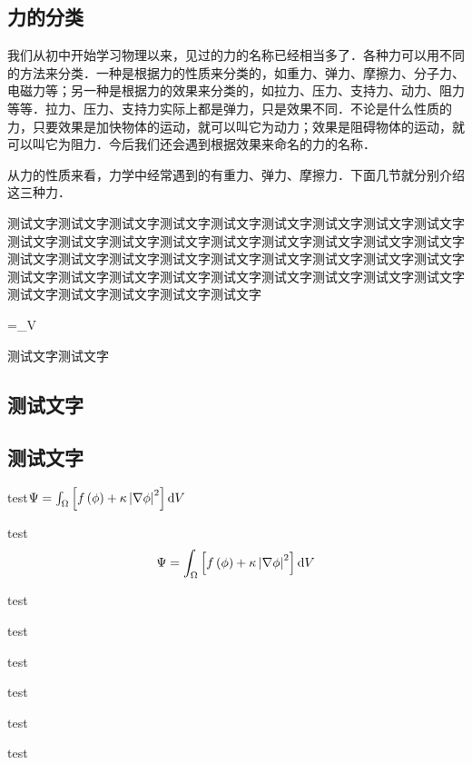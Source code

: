 \begin{Quiz}
\subsection{力的分类}

我们从初中开始学习物理以来，见过的力的名称已经相当多了．各种力可以用不同的方法来分类．一种是根据力的性质来分类的，如重力、弹力、摩擦力、分子力、电磁力等；另一种是根据力的效果来分类的，如拉力、压力、支持力、动力、阻力等等．拉力、压力、支持力实际上都是弹力，只是效果不同．不论是什么性质的力，只要效果是加快物体的运动，就可以叫它为动力；效果是阻碍物体的运动，就可以叫它为阻力．今后我们还会遇到根据效果来命名的力的名称．

从力的性质来看，力学中经常遇到的有重力、弹力、摩擦力．下面几节就分别介绍这三种力．


\begin{Example}
	测试文字测试文字测试文字测试文字测试文字测试文字测试文字测试文字测试文字测试文字测试文字测试文字测试文字测试文字测试文字测试文字测试文字测试文字测试文字测试文字测试文字测试文字测试文字测试文字测试文字测试文字测试文字测试文字测试文字测试文字测试文字测试文字测试文字测试文字测试文字测试文字测试文字测试文字测试文字测试文字测试文字
	\begin{flalign}
		\Psi=\int_\Omega{}V
	\end{flalign}
\end{Example}

\begin{Example}
	测试文字测试文字
\end{Example}


\subsection{测试文字}
\subsection*{测试文字}
\zhlipsum[1]


\Improve
\begin{QuestionItem}[2]
	\item test$\Psi=\int_\Omega\left[f\left(\phi\right)+\kappa\left|\nabla\phi\right|^2\right]{\rm d}V$
	\item test
	$$\Psi=\int_\Omega\left[f\left(\phi\right)+\kappa\left|\nabla\phi\right|^2\right]{\rm d}V$$
	\item test
	\item test
	\item test
	\item test
	\item test
	\item test
\end{QuestionItem}



\end{Quiz}
